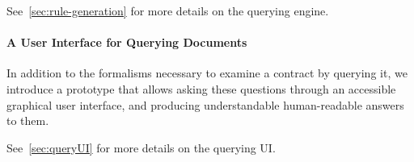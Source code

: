 See~\autoref{sec:rule-generation} for more details on the querying engine.

\paragraph{A User Interface for Querying Documents} In addition to the formalisms necessary to examine a contract by querying it, we introduce a prototype that allows asking these questions through an accessible graphical user interface, and producing understandable human-readable answers to them.

See~\autoref{sec:queryUI} for more details on the querying UI\@.

